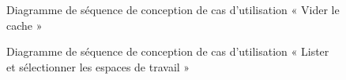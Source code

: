 \begin{figure}[H]
  \centering
  \caption{Diagramme de séquence de conception de cas d'utilisation «  Vider le cache »}
  \label{fig:conception_sequence_clear_cache}
\end{figure}

\begin{figure}[H]
  \centering
  \caption{Diagramme de séquence de conception de cas d'utilisation « Lister et sélectionner les espaces de travail »}
  \label{fig:conception_sequence_lister_selectionner_workspaces}
\end{figure}

